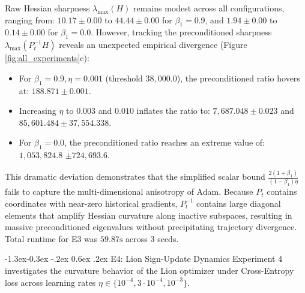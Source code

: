 \documentclass[10pt,twocolumn]{article}
\makeatletter
\renewcommand\subsection{\@startsection{subsection}{2}{\z@}%
                                     {-1.3ex\@plus -0.3ex \@minus -.2ex}%
                                     {0.6ex \@plus .2ex}%
                                     {\normalfont\normalsize\bfseries}}
\makeatother
\begin{document}
Raw Hessian sharpness $\lambda_{\max}(H)$ remains modest across all configurations, ranging from:
$10.17 \pm 0.00$
to
$44.44 \pm 0.00$
for $\beta_1=0.9$, and
$1.94 \pm 0.00$
to
$0.14 \pm 0.00$
for $\beta_1=0.0$.
However, tracking the preconditioned sharpness $\lambda_{\max}(P_t^{-1} H)$ reveals an unexpected empirical divergence (Figure \ref{fig:all_experiments}c):
\begin{itemize}
    \item For $\beta_1 = 0.9, \eta = 0.001$ (threshold $38{,}000.0$), the preconditioned ratio hovers at:
    $188.871 \pm 0.001$.
    \item Increasing $\eta$ to $0.003$ and $0.010$ inflates the ratio to:
    $7{,}687.048 \pm 0.023$
    and
    $85{,}601.484 \pm 37{,}554.338$.
    \item For $\beta_1=0.0$, the preconditioned ratio reaches an extreme value of:
    $1{,}053{,}824.8$ $\pm 724{,}693.6$.
\end{itemize}
This dramatic deviation demonstrates that the simplified scalar bound $\frac{2(1+\beta_1)}{(1-\beta_1)\eta}$ fails to capture the multi-dimensional anisotropy of Adam. Because $P_t$ contains coordinates with near-zero historical gradients, $P_t^{-1}$ contains large diagonal elements that amplify Hessian curvature along inactive subspaces, resulting in massive preconditioned eigenvalues without precipitating trajectory divergence. Total runtime for E3 was $59.87\text{s}$ %
across 3 seeds.

\subsection{E4: Lion Sign-Update Dynamics}
Experiment 4 investigates the curvature behavior of the Lion optimizer \cite{chen2023symbolic} under Cross-Entropy loss across learning rates $\eta \in \{10^{-4}, 3 \cdot 10^{-4}, 10^{-3}\}$.
\end{document}

